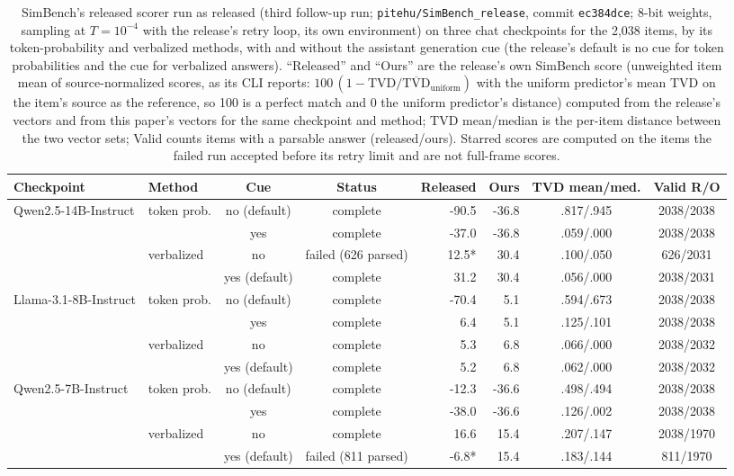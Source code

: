 \begin{table}[t]
\centering\scriptsize
\setlength{\tabcolsep}{2.5pt}
\begin{tabular}{@{}llccrrcc@{}}
\toprule
Checkpoint & Method & Cue & Status & Released & Ours & TVD mean/med. & Valid R/O \\
\midrule
Qwen2.5-14B-Instruct & token prob. & no (default) & complete & -90.5 & -36.8 & .817/.945 & 2038/2038 \\
 &  & yes & complete & -37.0 & -36.8 & .059/.000 & 2038/2038 \\
 & verbalized & no & failed (626 parsed) & 12.5* & 30.4 & .100/.050 & 626/2031 \\
 &  & yes (default) & complete & 31.2 & 30.4 & .056/.000 & 2038/2031 \\
\addlinespace[2pt]
Llama-3.1-8B-Instruct & token prob. & no (default) & complete & -70.4 & 5.1 & .594/.673 & 2038/2038 \\
 &  & yes & complete & 6.4 & 5.1 & .125/.101 & 2038/2038 \\
 & verbalized & no & complete & 5.3 & 6.8 & .066/.000 & 2038/2032 \\
 &  & yes (default) & complete & 5.2 & 6.8 & .062/.000 & 2038/2032 \\
\addlinespace[2pt]
Qwen2.5-7B-Instruct & token prob. & no (default) & complete & -12.3 & -36.6 & .498/.494 & 2038/2038 \\
 &  & yes & complete & -38.0 & -36.6 & .126/.002 & 2038/2038 \\
 & verbalized & no & complete & 16.6 & 15.4 & .207/.147 & 2038/1970 \\
 &  & yes (default) & failed (811 parsed) & -6.8* & 15.4 & .183/.144 & 811/1970 \\
\bottomrule
\end{tabular}
\caption{SimBench's released scorer run as released (third follow-up run; \texttt{pitehu/SimBench\_release}, commit \texttt{ec384dce}; 8-bit weights, sampling at $T{=}10^{-4}$ with the release's retry loop, its own environment) on three chat checkpoints for the 2,038 items, by its token-probability and verbalized methods, with and without the assistant generation cue (the release's default is no cue for token probabilities and the cue for verbalized answers). ``Released'' and ``Ours'' are the release's own SimBench score (unweighted item mean of source-normalized scores, as its CLI reports: $100\,(1-\mathrm{TVD}/\overline{\mathrm{TVD}}_{\text{uniform}})$ with the uniform predictor's mean TVD on the item's source as the reference, so 100 is a perfect match and 0 the uniform predictor's distance) computed from the release's vectors and from this paper's vectors for the same checkpoint and method; TVD mean/median is the per-item distance between the two vector sets; Valid counts items with a parsable answer (released/ours). Starred scores are computed on the items the failed run accepted before its retry limit and are not full-frame scores.}
\label{tab:released-scorer}
\end{table}
